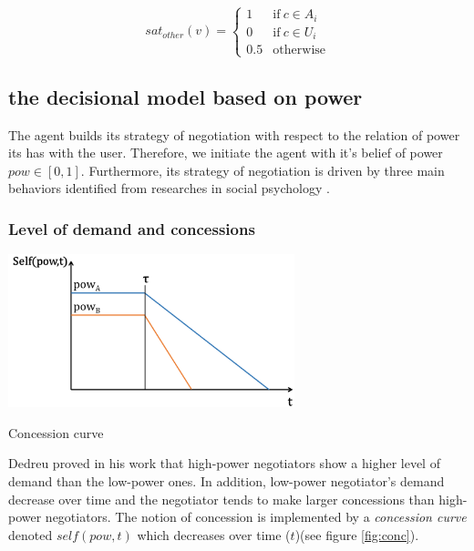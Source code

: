 \documentclass[runningheads,a4paper]{llncs}
\begin{document}
		\begin{equation}
		sat_{other}(v)= \left\{\begin{array}{ll}
		1	 & \mathrm{if\ }  c \in A_i\\
		0    & \mathrm{if\ }c \in U_i\\
		0.5	 & \mathrm{otherwise}
		\end{array}\right.
		\end{equation}
	
	\subsection{the decisional model based on power}
	
	The agent builds its strategy of negotiation with respect to the relation of power its has with the user. Therefore, we initiate the agent with it's belief of power $pow \in [0,1]$. Furthermore, its strategy of negotiation is driven by three main behaviors identified from researches in social psychology \cite{de1995impact,fiske1993controlling,magee2007power,de2004influence}. 

	\subsubsection{Level of demand and concessions}
		\begin{floatingfigure}[r]{2.75in}
			\includegraphics[width=2.75 in, height = 1.75in]{graphs/sv3.png}
			\caption{\label{fig:conc}Concession curve}
		\end{floatingfigure}  
	Dedreu proved in his work \cite{de1995impact} that high-power negotiators show a higher level of demand than the low-power ones. In addition, low-power negotiator's demand decrease over time and the negotiator tends to make larger concessions than high-power negotiators. 
	The notion of concession is implemented by a \emph{concession curve} denoted  $self(pow, t)$ which decreases over time ($t$)(see figure \ref{fig:conc}). 

	
\end{document}
